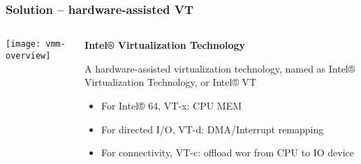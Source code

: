 \begin{frame}[plain]
	\frametitle{Solution -- hardware-assisted VT }
	
	
	
	\begin{columns}
		
		\begin{column}{.3\textwidth}
			
			\texttt{[image: vmm-overview]}
			
		\end{column}
		
		\begin{column}{.7\textwidth}
			
			\textbf{Intel® Virtualization Technology}
			
			A hardware-assisted virtualization technology, named as Intel® Virtualization Technology, or Intel® VT 
			\begin{itemize}
				\item For Intel® 64, VT-x: CPU MEM
				\item For directed I/O, VT-d: DMA/Interrupt remapping
				\item For connectivity, VT-c: offload wor from CPU to IO device

			\end{itemize} 
			
		\end{column}
		
		
	\end{columns}
	
	
\end{frame}

